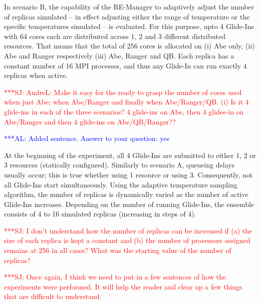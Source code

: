 \documentclass{rspublic}
\newcommand{\alnote}[1]{ {\textcolor{blue} { ***AL: #1 }}}
\newcommand{\jhanote}[1]{ {\textcolor{red} { ***SJ: #1 }}}
\newcommand{\alnote}[1]{}
\newcommand{\jhanote}[1]{}
\begin{document}
In scenario B, the capability of the RE-Manager to adaptively adjust
the number of replicas simulated -- in effect adjusting either the
range of temperature or the specific temperatures simulated -- is
evaluated. For this purpose, upto 4 Glide-Ins with 64 cores each are
distributed across 1, 2 and 3 different distributed resources. That
means that the total of 256 cores is allocated on (i) Abe only, (ii)
Abe and Ranger respectively (iii) Abe, Ranger and QB.  Each replica
has a constant number of 16 MPI processes, and thus any Glide-In can
run exactly 4 replicas when active.

\jhanote{AndreL: Make it easy for the ready to grasp the number of
  cores used when just Abe; when Abe/Ranger and finally when
  Abe/Ranger/QB. (i) Is it 4 glide-ins in each of the three scenarios?
  4 glide-ins on Abe, then 4 glides-in on Abe/Ranger and then 4
  glide-ins on Abe/QB/Ranger??}

\alnote{Added sentence. Answer to your question: yes}
              
At the beginning of the experiment, all 4 Glide-Ins are submitted to
either 1, 2 or 3 resources (statically configured).  Similarly to
scenario A, queueing delays usually occur; this is true whether using
1 resource or using 3.  Consequently, not all Glide-Ins start
simultaneously.  Using the adaptive temperature sampling algorithm,
the number of replicas is dynamically varied as the number of active
Glide-Ins increases. Depending on the number of running Glide-Ins, the
ensemble consists of 4 to 16 simulated replicas (increasing in steps
of 4).

\jhanote{I don't understand how the number of replicas can be
  increased if (a) the size of each replica is kept a constant and (b)
  the number of processors assigned remains at 256 in all cases? What
  was the starting value of the number of replicas?}  

\jhanote{Once again, I think we need to put in a few sentences of how
  the experiments were performed. It will help the reader and clear up
  a few things that are difficult to understand.}
\end{document}
